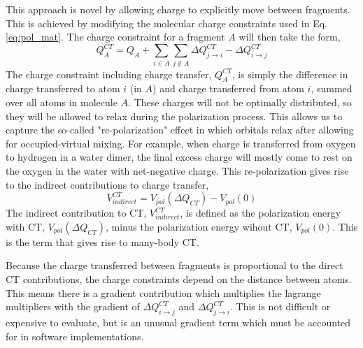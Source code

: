 \documentclass[journal=jctcce,manuscript=article]{achemso}
\begin{document}
This approach is novel by allowing charge to explicitly move between fragments. This is achieved by modifying the molecular charge constraints used in Eq. \ref{eq:pol_mat}. The charge constraint for a fragment $A$ will then take the form,
\begin{equation}
  Q^{CT}_A=Q_A+\sum_{i\in A}\sum_{j\notin A}\Delta Q^{CT}_{j\rightarrow i}-\Delta Q^{CT}_{i\rightarrow j}
  \label{eq:charge_constraint}
\end{equation}
The charge constraint including charge transfer, $Q^{CT}_A$, is simply the difference in charge transferred to atom $i$ (in $A$) and charge transferred from atom $i$, summed over all atoms in molecule $A$. These charges will not be optimally distributed, so they will be allowed to relax during the polarization process. This allows us to capture the so-called "re-polarization"\cite{khaliullin2007} effect in which orbitals relax after allowing for occupied-virtual mixing. For example, when charge is transferred from oxygen to hydrogen in a water dimer, the final excess charge will mostly come to rest on the oxygen in the water with net-negative charge. This re-polarization gives rise to the indirect contributions to charge transfer,
\begin{equation}
  V_{indirect}^{CT}=V_{pol}(\Delta Q_{CT})-V_{pol}(0)
  \label{eq:ct_indirect}
\end{equation}
\noindent
The indirect contribution to CT, $V_{indirect}^{CT}$, is defined as the polarization energy with CT, $V_{pol}(\Delta Q_{CT})$, minus the polarization energy wihout CT, $V_{pol}(0)$. This is the term that gives rise to many-body CT.

Because the charge transferred between fragments is proportional to the direct CT contributions, the charge constraints depend on the distance between atoms. This means there is a gradient contribution which multiplies the lagrange multipliers with the gradient of $\Delta Q^{CT}_{i\rightarrow j}$ and $\Delta Q^{CT}_{j\rightarrow i}$. This is not difficult or expensive to evaluate, but is an  unusual gradient term which must be accounted for in software implementations.
\end{document}
